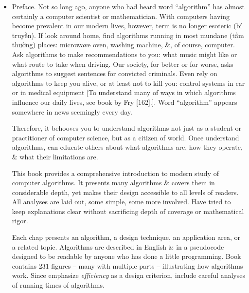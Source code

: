 \documentclass{article}
\begin{document}
\begin{itemize}
\begin{itemize}
		\item ``Machine learning can be thought of as a method for performing algorithmic tasks without explicitly designing an algorithm, but instead inferring patterns from data \& thereby automatically learning a solution.''
		\item ``The running time of an algorithm on a particular input is the number of instructions \& data accesses executed.''
	\end{itemize}
	{\sf About Author.} {\sc Thomas H. Cormen} is Emeritus Professor of Computer Science at Dartmouth College. {\sc Charles E. Leiserson} is Edwin Sibley Webster Professor in Electrical Engineering \& Computer Science at MIT. {\sc Ronald L. Rivest} is Institute Professor at MIT. {\sc Clifford Stein} is Wai T. Chang Professor of Industrial Engineering \& Operations Research, \& of Computer Science at Columbia University.
	\item {\sf Preface.} Not so long ago, anyone who had heard word ``algorithm'' has almost certainly a computer scientist or mathematician. With computers having become prevalent in our modern lives, however, term is no longer esoteric (bí truyền). If look around home, find algorithms running in most mundane (tầm thường) places: microwave oven, washing machine, \&, of course, computer. Ask algorithms to make recommendations to you: what music might like or what route to take when driving. Our society, for better or for worse, asks algorithms to suggest sentences for convicted criminals. Even rely on algorithms to keep you alive, or at least not to kill you: control systems in car or in medical equipment [To understand many of ways in which algorithms influence our daily lives, see book by {\sc Fry} [162].]. Word ``algorithm'' appears somewhere in news seemingly every day.
	
	Therefore, it behooves you to understand algorithms not just as a student or practitioner of computer science, but as a citizen of world. Once understand algorithms, can educate others about what algorithms are, how they operate, \& what their limitations are.
	
	This book provides a comprehensive introduction to modern study of computer algorithms. It presents many algorithms \& covers them in considerable depth, yet makes their design accessible to all levels of readers. All analyses are laid out, some simple, some more involved. Have tried to keep explanations clear without sacrificing depth of coverage or mathematical rigor.
	
	Each chap presents an algorithm, a design technique, an application area, or a related topic. Algorithms are described in English \& in a pseudocode designed to be readable by anyone who has done a little programming. Book contains 231 figures -- many with multiple parts -- illustrating how algorithms work. Since emphasize {\it efficiency} as a design criterion, include careful analyses of running times of algorithms.
	

\end{itemize}
\end{document}
